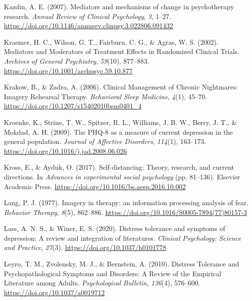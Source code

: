 \documentclass[
  man,floatsintext]{apa7}
\newlength{\cslhangindent}
\newlength{\cslentryspacingunit} %
\newenvironment{CSLReferences}[2] %
 {%
  \setlength{\parindent}{0pt}
  \ifodd #1
  \let\oldpar\par
  \def\par{\hangindent=\cslhangindent\oldpar}
  \fi
  \setlength{\parskip}{#2\cslentryspacingunit}
 }%
 {}
\begin{document}
\begin{CSLReferences}{1}{0}
\leavevmode{}%
Kazdin, A. E. (2007). Mediators and mechanisms of change in psychotherapy research. \emph{Annual Review of Clinical Psychology}, \emph{3}, 1--27. \url{https://doi.org/10.1146/annurev.clinpsy.3.022806.091432}

\leavevmode{}%
Kraemer, H. C., Wilson, G. T., Fairburn, C. G., \& Agras, W. S. (2002). Mediators and Moderators of Treatment Effects in Randomized Clinical Trials. \emph{Archives of General Psychiatry}, \emph{59}(10), 877--883. \url{https://doi.org/10.1001/archpsyc.59.10.877}

\leavevmode{}%
Krakow, B., \& Zadra, A. (2006). Clinical Management of Chronic Nightmares: Imagery Rehearsal Therapy. \emph{Behavioral Sleep Medicine}, \emph{4}(1), 45--70. \url{https://doi.org/10.1207/s15402010bsm0401_4}

\leavevmode{}%
Kroenke, K., Strine, T. W., Spitzer, R. L., Williams, J. B. W., Berry, J. T., \& Mokdad, A. H. (2009). The PHQ-8 as a measure of current depression in the general population. \emph{Journal of Affective Disorders}, \emph{114}(1), 163--173. \url{https://doi.org/10.1016/j.jad.2008.06.026}

\leavevmode{}%
Kross, E., \& Ayduk, O. (2017). Self-distancing: Theory, research, and current directions. In \emph{Advances in experimental social psychology} (pp. 81--136). Elsevier Academic Press. \url{https://doi.org/10.1016/bs.aesp.2016.10.002}

\leavevmode{}%
Lang, P. J. (1977). Imagery in therapy: an information processing analysis of fear. \emph{Behavior Therapy}, \emph{8}(5), 862--886. \url{https://doi.org/10.1016/S0005-7894(77)80157-3}

\leavevmode{}%
Lass, A. N. S., \& Winer, E. S. (2020). Distress tolerance and symptoms of depression: A review and integration of literatures. \emph{Clinical Psychology: Science and Practice}, \emph{27}(3). \url{https://doi.org/10.1037/h0101778}

\leavevmode{}%
Leyro, T. M., Zvolensky, M. J., \& Bernstein, A. (2010). Distress Tolerance and Psychopathological Symptoms and Disorders: A Review of the Empirical Literature among Adults. \emph{Psychological Bulletin}, \emph{136}(4), 576--600. \url{https://doi.org/10.1037/a0019712}


\end{CSLReferences}
\end{document}
